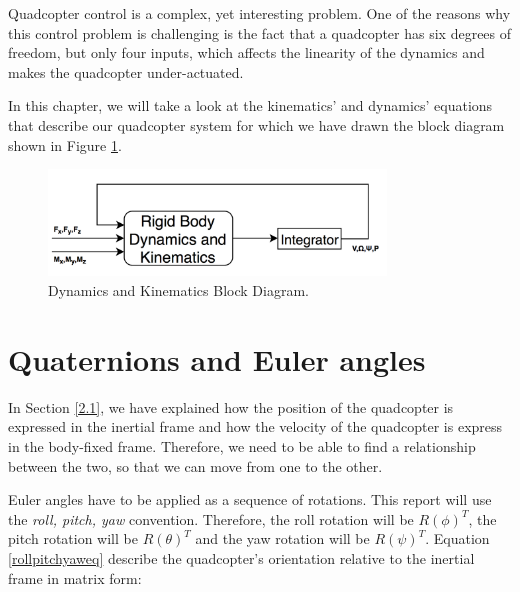 Quadcopter control is a complex, yet interesting problem. One of the reasons why this control problem is challenging is the fact that a quadcopter has six degrees of freedom, but only four inputs, which affects the linearity of the dynamics and makes the quadcopter under-actuated. 

In this chapter, we will take a look at the kinematics' and dynamics' equations that describe our quadcopter system for which we have drawn the block diagram shown in Figure \ref{dk}.

\begin{figure}[H]
  \centering
    \includegraphics[width=0.8\textwidth]{images/blockdiagram.png}
	\caption{Dynamics and Kinematics Block Diagram.}
	\label{dk}
\end{figure}

\section{Quaternions and Euler angles}
In Section \ref{2.1}, we have explained how the position of the quadcopter is expressed in the inertial frame and how the  velocity of the quadcopter is express in the body-fixed frame. Therefore, we need to be able to find a relationship between the two, so that we can move from one to the other.

Euler angles have to be applied as a sequence of rotations. This report will use the \textit{roll, pitch, yaw} convention. Therefore, the roll rotation will be $R(\phi)^{T}$, the pitch rotation will be $R(\theta)^{T}$ and the yaw rotation will be $R(\psi)^{T}$. Equation \ref{rollpitchyaweq} describe the quadcopter's orientation relative to the inertial frame in matrix form:

